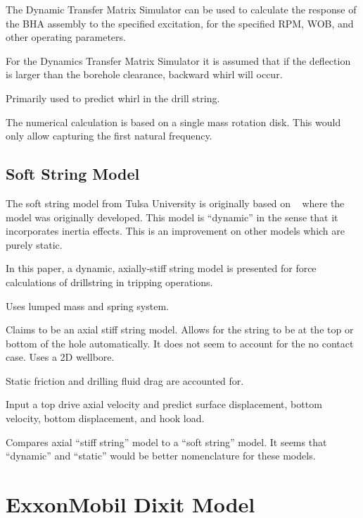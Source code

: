 The Dynamic Transfer Matrix Simulator can be used to calculate the response of the BHA assembly to the specified excitation, for the specified RPM, WOB, and other operating parameters.

For the Dynamics Transfer Matrix Simulator it is assumed that if the deflection is larger than the borehole clearance, backward whirl will occur.

Primarily used to predict whirl in the drill string.

The numerical calculation is based on a single mass rotation disk.  This would only allow capturing the first natural frequency.

\notfinished{}


\subsection{Soft String Model}
The soft string model from Tulsa University is originally based on ~\cite{ref:miska2015a} where the model was originally developed.  This model is ``dynamic'' in the sense that it incorporates inertia effects.  This is an improvement on other models which are purely static.

\notfinished{}

\cite{ref:zamanipour2018a}

In this paper, a dynamic, axially-stiff string model is presented for force calculations of drillstring in tripping operations.

Uses lumped mass and spring system.

Claims to be an axial stiff string model.  Allows for the string to be at the top or bottom of the hole automatically.  It does not seem to account for the no contact case.
Uses a 2D wellbore.

Static friction and drilling fluid drag are accounted for.

Input a top drive axial velocity and predict surface displacement, bottom velocity, bottom displacement, and hook load.

Compares axial ``stiff string'' model to a ``soft string'' model.  It seems that ``dynamic'' and ``static'' would be better nomenclature for these models.

\section{ExxonMobil Dixit Model}

\notfinished{}
